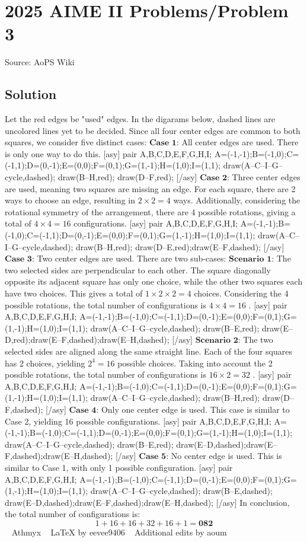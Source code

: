 \documentclass[12pt]{article}
\begin{document}
\section*{{2025 AIME II Problems/Problem 3}}
Source: AoPS Wiki

\subsection*{Solution}
Let the red edges be "used" edges. In the digarams below, dashed lines are uncolored lines yet to be decided. Since all four center edges are common to both squares, we consider five distinct cases: $\textbf{Case 1:}$ All center edges are used. There is only one way to do this. [asy] pair A,B,C,D,E,F,G,H,I; A=(-1,-1);B=(-1,0);C=(-1,1);D=(0,-1);E=(0,0);F=(0,1);G=(1,-1);H=(1,0);I=(1,1); draw(A--C--I--G--cycle,dashed); draw(B--H,red); draw(D--F,red); [/asy] $\textbf{Case 2:}$ Three center edges are used, meaning two squares are missing an edge. For each square, there are 2 ways to choose an edge, resulting in $2 \times 2 = 4$ ways. Additionally, considering the rotational symmetry of the arrangement, there are 4 possible rotations, giving a total of $4 \times 4 = 16$ configurations. [asy] pair A,B,C,D,E,F,G,H,I; A=(-1,-1);B=(-1,0);C=(-1,1);D=(0,-1);E=(0,0);F=(0,1);G=(1,-1);H=(1,0);I=(1,1); draw(A--C--I--G--cycle,dashed); draw(B--H,red); draw(D--E,red);draw(E--F,dashed); [/asy] $\textbf{Case 3:}$ Two center edges are used. There are two sub-cases: $\textbf{Scenario 1:}$ The two selected sides are perpendicular to each other. The square diagonally opposite its adjacent square has only one choice, while the other two squares each have two choices. This gives a total of $1 \times 2 \times 2 = 4$ choices. Considering the 4 possible rotations, the total number of configurations is $4 \times 4 = 16$ . [asy] pair A,B,C,D,E,F,G,H,I; A=(-1,-1);B=(-1,0);C=(-1,1);D=(0,-1);E=(0,0);F=(0,1);G=(1,-1);H=(1,0);I=(1,1); draw(A--C--I--G--cycle,dashed); draw(B--E,red); draw(E--D,red);draw(E--F,dashed);draw(E--H,dashed); [/asy] $\textbf{Scenario 2:}$ The two selected sides are aligned along the same straight line. Each of the four squares has 2 choices, yielding $2^4 = 16$ possible choices. Taking into account the 2 possible rotations, the total number of configurations is $16 \times 2 = 32$ . [asy] pair A,B,C,D,E,F,G,H,I; A=(-1,-1);B=(-1,0);C=(-1,1);D=(0,-1);E=(0,0);F=(0,1);G=(1,-1);H=(1,0);I=(1,1); draw(A--C--I--G--cycle,dashed); draw(B--H,red); draw(D--F,dashed); [/asy] $\textbf{Case 4:}$ Only one center edge is used. This case is similar to Case 2, yielding 16 possible configurations. [asy] pair A,B,C,D,E,F,G,H,I; A=(-1,-1);B=(-1,0);C=(-1,1);D=(0,-1);E=(0,0);F=(0,1);G=(1,-1);H=(1,0);I=(1,1); draw(A--C--I--G--cycle,dashed); draw(B--E,red); draw(E--D,dashed);draw(E--F,dashed);draw(E--H,dashed); [/asy] $\textbf{Case 5:}$ No center edge is used. This is similar to Case 1, with only 1 possible configuration. [asy] pair A,B,C,D,E,F,G,H,I; A=(-1,-1);B=(-1,0);C=(-1,1);D=(0,-1);E=(0,0);F=(0,1);G=(1,-1);H=(1,0);I=(1,1); draw(A--C--I--G--cycle,dashed); draw(B--E,dashed); draw(E--D,dashed);draw(E--F,dashed);draw(E--H,dashed); [/asy] In conclusion, the total number of configurations is: \[1 + 16 + 16 + 32 + 16 + 1 = \boxed{\textbf{082}}\] ~ Athmyx ~ LaTeX by eevee9406 ~ Additional edits by aoum
\end{document}
